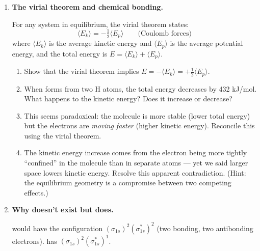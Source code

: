 \documentclass[12pt, a4paper]{book}
\begin{document}
\begin{deepbox}
\begin{enumerate}[label=\textbf{D\arabic*.}]

  \item \textbf{The virial theorem and chemical bonding.}

        For any system in equilibrium, the virial theorem states:
        \[
          \langle E_k \rangle = -\tfrac{1}{2}\langle E_p \rangle
          \qquad \text{(Coulomb forces)}
        \]
        where $\langle E_k \rangle$ is the average kinetic energy
        and $\langle E_p \rangle$ is the average potential energy,
        and the total energy is $E = \langle E_k \rangle + \langle E_p \rangle$.

        \begin{enumerate}[label=(\alph*)]
          \item Show that the virial theorem implies
                $E = -\langle E_k \rangle = +\tfrac{1}{2}\langle E_p \rangle$.
          \item When  forms from two H atoms,
                the total energy decreases by 432 kJ/mol.
                What happens to the kinetic energy?
                Does it increase or decrease?
          \item This seems paradoxical: the molecule is
                more stable (lower total energy) but the
                electrons are \emph{moving faster}
                (higher kinetic energy).
                Reconcile this using the virial theorem.
          \item The kinetic energy increase comes from
                the electron being more tightly ``confined''
                in the molecule than in separate atoms ---
                yet we said larger space lowers kinetic energy.
                Resolve this apparent contradiction.
                (Hint: the equilibrium geometry is a
                compromise between two competing effects.)
        \end{enumerate}

  \item \textbf{Why  doesn't exist but  does.}

         would have the configuration
        $(\sigma_{1s})^2 (\sigma^*_{1s})^2$
        (two bonding, two antibonding electrons).
         has $(\sigma_{1s})^2 (\sigma^*_{1s})^1$.


\end{enumerate}
\end{deepbox}
\end{document}
